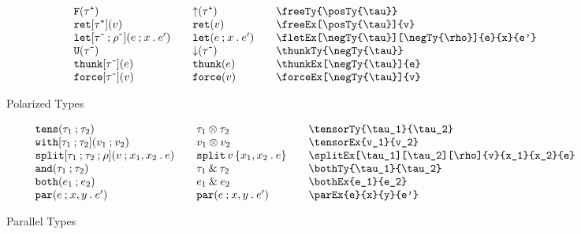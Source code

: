 \documentclass[11pt]{article}
\begin{document}
\begin{figure}

  \begin{small}
    \begin{displaymath}
      \begin{array}{l@{\qquad}l@{\qquad}l@{\qquad}l}
        \freeTy{\posTy{\tau}}                         & \freeTy*{\posTy{\tau}}    & \verb|\freeTy{\posTy{\tau}}|                         \\
        \freeEx[\posTy{\tau}]{v}                      & \freeEx*[\posTy{\tau}]{v} & \verb|\freeEx[\posTy{\tau}]{v}|                      \\
        \fletEx[\negTy{\tau}][\negTy{\rho}]{e}{x}{e'} & \fletEx*{e}{x}{e'}        & \verb|\fletEx[\negTy{\tau}][\negTy{\rho}]{e}{x}{e'}| \\
        \thunkTy{\negTy{\tau}}                        & \thunkTy*{\negTy{\tau}}   & \verb|\thunkTy{\negTy{\tau}}|                        \\
        \thunkEx[\negTy{\tau}]{e}                     & \thunkEx*{e}              & \verb|\thunkEx[\negTy{\tau}]{e}|                     \\
        \forceEx[\negTy{\tau}]{v}                     & \forceEx*{v}              & \verb|\forceEx[\negTy{\tau}]{v}|
      \end{array}
    \end{displaymath}
  \end{small}

  \caption{Polarized Types}
  \label{fig:pol}
\end{figure}

\begin{figure}

  \begin{small}
    \begin{displaymath}
      \begin{array}{l@{\qquad}l@{\qquad}l@{\qquad}l}
        \tensorTy{\tau_1}{\tau_2} & \tensorTy*{\tau_1}{\tau_2} & \verb|\tensorTy{\tau_1}{\tau_2}| \\
        \tensorEx{v_1}{v_2}       & \tensorEx*{v_1}{v_2}       & \verb|\tensorEx{v_1}{v_2}|       \\
        \splitEx[\tau_1][\tau_2][\rho]{v}{x_1}{x_2}{e}  & \splitEx*{v}{x_1}{x_2}{e}  & \verb|\splitEx[\tau_1][\tau_2][\rho]{v}{x_1}{x_2}{e}|  \\
        \bothTy{\tau_1}{\tau_2}   & \bothTy*{\tau_1}{\tau_2}   & \verb|\bothTy{\tau_1}{\tau_2}|   \\
        \bothEx{e_1}{e_2}         & \bothEx*{e_1}{e_2}         & \verb|\bothEx{e_1}{e_2}|         \\
        \parEx{e}{x}{y}{e'}       & \parEx*{e}{x}{y}{e'}       & \verb|\parEx{e}{x}{y}{e'}|
      \end{array}
    \end{displaymath}
  \end{small}

  \caption{Parallel Types}
  \label{fig:par}
\end{figure}
\end{document}
